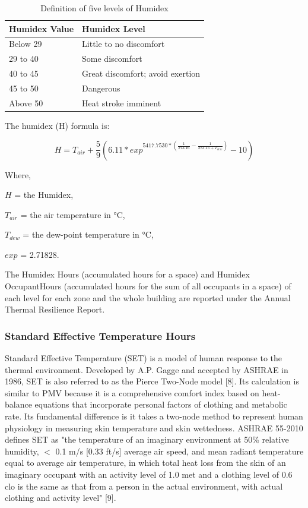 \begin{table}
\centering
\caption{Definition of five levels of Humidex \protect \label{table:humidex-chart}} \tabularnewline
\begin{tabular}{ |p{1in}|p{3in}|  }
\hline
      \textbf{Humidex Value} & \textbf{Humidex Level} \\ \hline
      Below 29 & Little to no discomfort \\ \hline
      29 to 40 & Some discomfort \\ \hline
      40 to 45 & Great discomfort; avoid exertion \\ \hline
      45 to 50 & Dangerous \\ \hline
      Above 50 & Heat stroke imminent \\ \hline
\end{tabular}
\end{table}

The humidex (H) formula is:

\begin{equation}  \label{eq:rm-5}
H = T_{air} + \frac{5}{9}(6.11 * exp^{5417.7530 * (\frac{1}{273.16} - \frac{1}{273.15 + T_{dew}})} - 10)
\end{equation}

Where,

$H$ = the Humidex,

$T_{air}$ = the air temperature in \si{\celsius},

$T_{dew}$ = the dew-point temperature in \si{\celsius},

$exp$ = 2.71828.

The Humidex Hours (accumulated hours for a space) and Humidex OccupantHours (accumulated hours for the sum of all occupants in a space) of each level for each zone and the whole building are reported under the Annual Thermal Resilience Report.

\subsubsection{Standard Effective Temperature Hours}\label{set-hour}
Standard Effective Temperature (SET) is a model of human response to the thermal environment. Developed by A.P. Gagge and accepted by ASHRAE in 1986, SET is also referred to as the Pierce Two-Node model [8]. Its calculation is similar to PMV because it is a comprehensive comfort index based on heat-balance equations that incorporate personal factors of clothing and metabolic rate. Its fundamental difference is it takes a two-node method to represent human physiology in measuring skin temperature and skin wettedness. ASHRAE 55-2010 defines SET as "the temperature of an imaginary environment at 50\% relative humidity, $<$ 0.1 m/s [0.33 ft/s] average air speed, and mean radiant temperature equal to average air temperature, in which total heat loss from the skin of an imaginary occupant with an activity level of 1.0 met and a clothing level of 0.6 clo is the same as that from a person in the actual environment, with actual clothing and activity level" [9].

